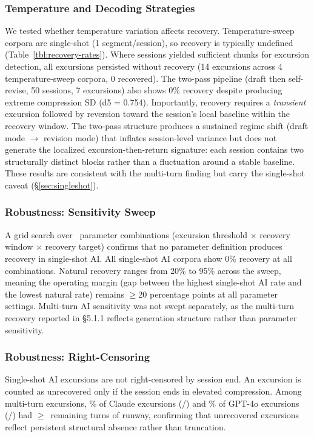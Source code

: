 \documentclass[11pt]{article}
\begin{document}
\subsubsection{Temperature and Decoding Strategies}

We tested whether temperature variation affects recovery. Temperature-sweep corpora are single-shot (1 segment/session), so recovery is typically undefined (Table~\ref{tbl:recovery-rates}). Where sessions yielded sufficient chunks for excursion detection, all excursions persisted without recovery (14 excursions across 4 temperature-sweep corpora, 0 recovered). The two-pass pipeline (draft then self-revise, 50 sessions, 7 excursions) also shows 0\% recovery despite producing extreme compression SD (d5 = 0.754). Importantly, recovery requires a \textit{transient} excursion followed by reversion toward the session's local baseline within the recovery window. The two-pass structure produces a sustained regime shift (draft mode $\to$ revision mode) that inflates session-level variance but does not generate the localized excursion-then-return signature: each session contains two structurally distinct blocks rather than a fluctuation around a stable baseline. These results are consistent with the multi-turn finding but carry the single-shot caveat (\S\ref{sec:singleshot}).

\subsubsection{Robustness: Sensitivity Sweep}

A grid search over \nSensitivityCombos\ parameter combinations (excursion threshold $\times$ recovery window $\times$ recovery target) confirms that no parameter definition produces recovery in single-shot AI. All single-shot AI corpora show 0\% recovery at all \nSensitivityCombos{} combinations. Natural recovery ranges from 20\% to 95\% across the sweep, meaning the operating margin (gap between the highest single-shot AI rate and the lowest natural rate) remains $\geq$20 percentage points at all parameter settings. Multi-turn AI sensitivity was not swept separately, as the multi-turn recovery reported in \S5.1.1 reflects generation structure rather than parameter sensitivity.

\subsubsection{Robustness: Right-Censoring}

Single-shot AI excursions are not right-censored by session end. An excursion is counted as unrecovered only if the session ends in elevated compression. Among multi-turn excursions, \censorClaudePct\% of Claude excursions (\censorClaudeN/\censorClaudeOf) and \censorGPTPct\% of GPT-4o excursions (\censorGPTN/\censorGPTOf) had $\geq$\censorMinTurns\ remaining turns of runway, confirming that unrecovered excursions reflect persistent structural absence rather than truncation.
\end{document}
